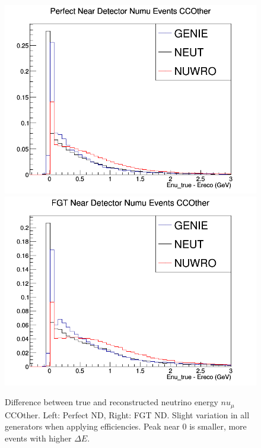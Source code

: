 \documentclass[12pt]{article}
\begin{document}
\begin{figure}[h]
\centering
{}
\includegraphics[width=\linewidth]{Ereco_Etrue/numu_perfect_ND_CCOther.png}
\endminipage
{}
\includegraphics[width=\linewidth]{Ereco_Etrue/numu_FGT_CCOther.png}
\endminipage
\newline
\caption{Difference between true and reconstructed neutrino energy $nu_\mu$ CCOther. Left: Perfect ND, Right: FGT ND. Slight variation in all generators when applying efficiencies. Peak near 0 is smaller, more events with higher $\Delta E$.}
\label{fig:numu_Etrue_ereco_perfect_FGT_CCOther}
\end{figure}
\FloatBarrier
\end{document}

